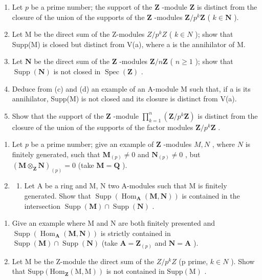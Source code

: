 \begin{enumerate}
\def\labelenumi{(\alph{enumi})}
\setcounter{enumi}{1}
\item
  Let \(p\) be a prime number; the support of the \(\mathbf{Z}\) -module \(\mathbf{Z}\) is distinct from the closure of the union of the supports of the \(\mathbf{Z}\) -modules \(\mathbf{Z} / p^k\mathbf{Z}\) ( \(k \in \mathbf{N}\) ).
\item
  Let M be the direct sum of the Z-modules \(Z/p^{k}Z\) ( \(k \in N\) ); show that Supp(M) is closed but distinct from V(a), where a is the annihilator of M.
\item
  Let \(\mathbf{N}\) be the direct sum of the \(\mathbf{Z}\) -modules \(\mathbf{Z} / n\mathbf{Z}\) ( \(n \geqslant 1\) ); show that \(\operatorname{Supp}(\mathbf{N})\) is not closed in \(\operatorname{Spec}(\mathbf{Z})\) .
\item
  Deduce from (c) and (d) an example of an A-module M such that, if a is its annihilator, Supp(M) is not closed and its closure is distinct from V(a).
\item
  Show that the support of the \(\mathbf{Z}\) -module \(\prod_{k=1}^{n} (\mathbf{Z}/p^k\mathbf{Z})\) is distinct from the closure of the union of the supports of the factor modules \(\mathbf{Z}/p^k\mathbf{Z}\) .
\end{enumerate}

\begin{enumerate}
\def\labelenumi{\arabic{enumi}.}
\setcounter{enumi}{22}
\item
  Let \(p\) be a prime number; give an example of \(\mathbf{Z}\) -modules \(M, N\) , where \(N\) is finitely generated, such that \(\mathbf{M}_{(p)} \neq 0\) and \(\mathbf{N}_{(p)} \neq 0\) , but \((\mathbf{M} \otimes_{\mathbf{Z}} \mathbf{N})_{(p)} = 0\) (take \(\mathbf{M} = \mathbf{Q}\) ).
\item
  \begin{enumerate}
  \def\labelenumii{(\alph{enumii})}
  \tightlist
  \item
    Let A be a ring and M, N two A-modules such that M is finitely generated. Show that \(\operatorname{Supp}(\operatorname{Hom}_{\mathbf{A}}(\mathbf{M}, \mathbf{N}))\) is contained in the intersection \(\operatorname{Supp}(\mathbf{M}) \cap \operatorname{Supp}(\mathbf{N})\) .
  \end{enumerate}
\end{enumerate}

\begin{enumerate}
\def\labelenumi{(\alph{enumi})}
\setcounter{enumi}{1}
\item
  Give an example where M and N are both finitely presented and \(\operatorname{Supp}(\operatorname{Hom}_{\mathbf{A}}(\mathbf{M},\mathbf{N}))\) is strictly contained in \(\operatorname{Supp}(\mathbf{M}) \cap \operatorname{Supp}(\mathbf{N})\) (take \(\mathbf{A} = \mathbf{Z}_{(p)}\) and \(\mathbf{N} = \mathbf{A}\) ).
\item
  Let M be the Z-module the direct sum of the \(Z/p^{k}Z\) (p prime, \(k \in N\) ). Show that \(\text{Supp}(\text{Hom}_{\mathbf{Z}}(\text{M}, \text{M}))\) is not contained in \(\text{Supp}(\text{M})\) .
\end{enumerate}

